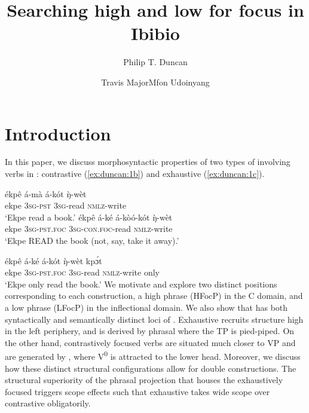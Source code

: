 \documentclass[output=paper,
modfonts
]{langscibook}
\title{Searching high and low for focus in Ibibio}
\author{Philip T. Duncan\affiliation{University of Kansas}\and Travis Major\affiliation{University of California, Los Angeles}\lastand  Mfon Udoinyang \affiliation{University of Kansas}}
\begin{document}
\maketitle


 
\section{Introduction}
In this paper, we discuss morphosyntactic properties of two types of  involving verbs in : contrastive   (\ref{ex:duncan:1b}) and exhaustive   (\ref{ex:duncan:1c}). 

\settowidth{}
\ea\label{ex:duncan:1}
\ea 
\gll ékpê á-mà á-kót \`{ŋ}-wèt \\
 ekpe 3\textsc{sg-pst} 3\textsc{sg}-read \textsc{nmlz}-write\\
\glt ‘Ekpe read a book.’
\ex \label{ex:duncan:1b}
\gll ékpê á-ké á-kòó-kót \`{ŋ}-wèt \\
 ekpe 3\textsc{sg}-\textsc{pst.foc} 3\textsc{sg}-\textsc{con.foc}-read \textsc{nmlz}-write\\
\glt ‘Ekpe READ the book (not, say, take it away).’

\ex \label{ex:duncan:1c}
\gll ékpê á-ké á-kót \`{ŋ}-wèt kp\'{ɔ}t \\
 ekpe 3\textsc{sg-pst.foc} \textsc{3sg}-read \textsc{nmlz}-write only\\
\glt ‘Ekpe only read the book.’
\z
\z
We motivate and explore two distinct  positions corresponding to each construction, a high  phrase (HFocP) in the C domain, and a low  phrase (LFocP) in the inflectional domain. We also show that  has both syntactically and semantically distinct loci of  . Exhaustive   recruits structure high in the left periphery, and is derived by phrasal  where the TP is pied-piped. On the other hand, contrastively focused verbs are situated much closer to VP and are generated by , where V\textsuperscript{0} is attracted to the lower  head. Moreover, we discuss how these distinct structural configurations allow for double   constructions. The structural superiority of the phrasal projection that houses the exhaustively focused  triggers scope effects such that exhaustive  takes wide scope over contrastive  obligatorily.
\end{document}
